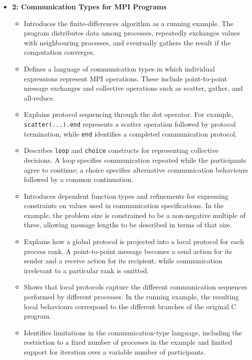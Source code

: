\begin{itemize}
    \item \textbf{2: Communication Types for MPI Programs}
    \begin{itemize}
        \item Introduces the finite-differences algorithm as a running example. The program distributes data among processes, repeatedly exchanges values with neighbouring processes, and eventually gathers the result if the computation converges.
        \item Defines a language of communication types in which individual expressions represent MPI operations. These include point-to-point message exchanges and collective operations such as scatter, gather, and all-reduce.
        \item Explains protocol sequencing through the dot operator. For example, \texttt{scatter(...).end} represents a scatter operation followed by protocol termination, while \texttt{end} identifies a completed communication protocol.
        \item Describes \texttt{loop} and \texttt{choice} constructs for representing collective decisions. A loop specifies communication repeated while the participants agree to continue; a choice specifies alternative communication behaviours followed by a common continuation.
        \item Introduces dependent function types and refinements for expressing constraints on values used in communication specifications. In the example, the problem size is constrained to be a non-negative multiple of three, allowing message lengths to be described in terms of that size.
        \item Explains how a global protocol is projected into a local protocol for each process rank. A point-to-point message becomes a send action for its sender and a receive action for its recipient, while communication irrelevant to a particular rank is omitted.
        \item Shows that local protocols capture the different communication sequences performed by different processes. In the running example, the resulting local behaviours correspond to the different branches of the original C program.
        \item Identifies limitations in the communication-type language, including the restriction to a fixed number of processes in the example and limited support for iteration over a variable number of participants.
    \end{itemize}


\end{itemize}
